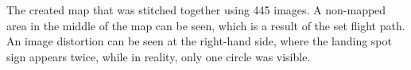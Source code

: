 The created map that was stitched together using 445 images. A non-mapped area in the middle of the map can be seen, which is a result of the set flight path. An image distortion can be seen at the right-hand side, where the landing spot sign appears twice, while in reality, only one circle was visible.